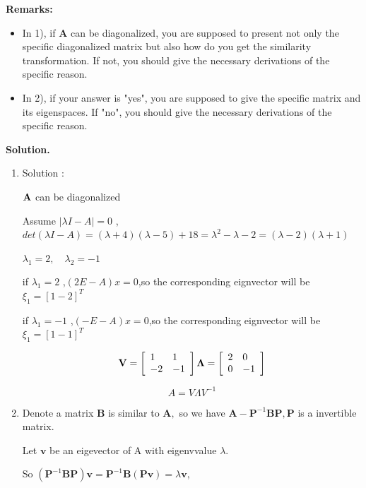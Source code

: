 \documentclass[english,onecolumn]{IEEEtran}
\newcommand{\bA}{{\bf A}}
\begin{document}
{\bf Remarks:} 
\begin{itemize}
    \item In 1), if {\bf A} can be diagonalized, you are supposed to present not only the specific diagonalized matrix but also how do you get the similarity transformation.
    If not, you should give the necessary derivations of the specific reason.
    \item In 2), if your answer is "yes", you are supposed to give the specific matrix and its eigenspaces.
    If "no", you should give the necessary derivations of the specific reason.
\end{itemize}

\noindent
\textbf{Solution.}
\begin{enumerate}
    \item 
    Solution :
    
    $\bA$ can be diagonalized
    
    Assume $|\lambda I - A| = 0$ , $det(\lambda I - A)=(\lambda +4)(\lambda-5)+18 = \lambda^2-\lambda-2=(\lambda-2)(\lambda+1)$
    
    $\lambda_1 = 2,\quad \lambda_2 = -1$
    
    if $\lambda_1 =2$ ,$(2E-A)x = 0$,so the corresponding eignvector will be $\xi_1 = [1 -2]^T$
    
    if $\lambda_1 =-1$ ,$(-E-A)x = 0$,so the corresponding eignvector will be $\xi_1 = [1 -1]^T$
    
    $$
     {\bf V} = \left[\begin{array}{ll}
    	 1 & 1 \\
    	-2 & -1
    \end{array}\right]   
	 {\bf \Lambda} = \left[\begin{array}{ll}
		2 & 0\\
		0 & -1
	\end{array}\right]
$$

$$A = V \Lambda V^{-1}$$

    \item 
     Denote a matrix $\mathbf{B}$ is similar to $\mathbf{A},$ so we have $\mathbf{A}-\mathbf{P}^{-1} \mathbf{B} \mathbf{P}, \mathbf{P}$ is a invertible matrix. 
     
     Let $\mathbf{v}$ be an eigevector of $\mathrm{A}$ with eigenvvalue $\lambda$. 
     
    So $\left(\mathbf{P}^{-1} \mathbf{B P}\right) \mathbf{v} =\mathbf{P}^{-1} \mathbf{B}(\mathbf{P} \mathbf{v}) =\lambda \mathbf{v},$ 
    

\end{enumerate}
\end{document}
